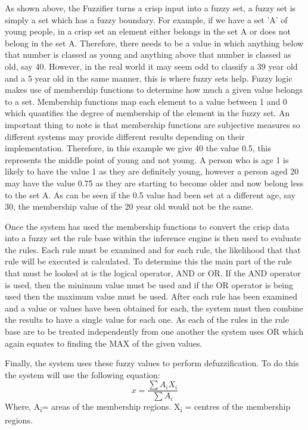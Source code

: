 \documentclass{article}
\begin{document}
As shown above, the Fuzzifier turns a crisp input into a fuzzy set, a fuzzy set is simply a set which has a fuzzy boundary. For example, if we have a set 'A' of young people, in a crisp set an element either belongs in the set A or does not belong in the set A. Therefore, there needs to be a value in which anything below that number is classed as young and anything above that number is classed as old, say 40. However, in the real world it may seem odd to classify a 39 year old and a 5 year old in the same manner, this is where fuzzy sets help. Fuzzy logic makes use of membership functions to determine how much a given value belongs to a set. Membership functions map each element to a value between 1 and 0 which quantifies the degree of membership of the element in the fuzzy set. An important thing to note is that membership functions are subjective measures so different systems may provide different results depending on their implementation. Therefore, in this example we give 40 the value 0.5, this represents the middle point of young and not young. A person who is age 1 is likely to have the value 1 as they are definitely young, however a person aged 20 may have the value 0.75 as they are starting to become older and now belong less to the set A. As can be seen if the 0.5 value had been set at a different age, say 30, the membership value of the 20 year old would not be the same.

Once the system has used the membership functions to convert the crisp data into a fuzzy set the rule base within the inference engine is then used to evaluate the rules. Each rule must be examined and for each rule, the likelihood that that rule will be executed is calculated. To determine this the main part of the rule that must be looked at is the logical operator, AND or OR. If the AND operator is used, then the minimum value must be used and if the OR operator is being used then the maximum value must be used. After each rule has been examined and a value or values have been obtained for each, the system must then combine the results to have a single value for each one. As each of the rules in the rule base are to be treated independently from one another the system uses OR which again equates to finding the MAX of the given values.

Finally, the system uses these fuzzy values to perform defuzzification. To do this the system will use the following equation:
\[ 
	x = \frac {\sum A_i X_i}{\sum A_i}
\]
Where,
A\textsubscript{i}= areas of the membership regions.
X\textsubscript{i} = centres of the membership regions.
\end{document}
